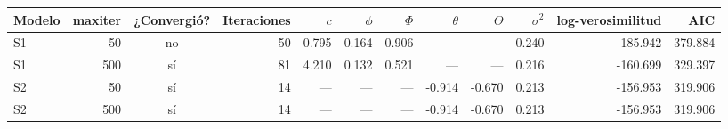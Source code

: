 \begin{tabular}{lrcrrrrrrrrr}
\toprule
Modelo & maxiter & ¿Convergió? & Iteraciones & $c$ & $\phi$ & $\Phi$ & $\theta$ & $\Theta$ & $\sigma^2$ & log-verosimilitud & AIC \\
\midrule
S1 & 50 & no & 50 & 0.795 & 0.164 & 0.906 & --- & --- & 0.240 & -185.942 & 379.884 \\
S1 & 500 & sí & 81 & 4.210 & 0.132 & 0.521 & --- & --- & 0.216 & -160.699 & 329.397 \\
S2 & 50 & sí & 14 & --- & --- & --- & -0.914 & -0.670 & 0.213 & -156.953 & 319.906 \\
S2 & 500 & sí & 14 & --- & --- & --- & -0.914 & -0.670 & 0.213 & -156.953 & 319.906 \\
\bottomrule
\end{tabular}
